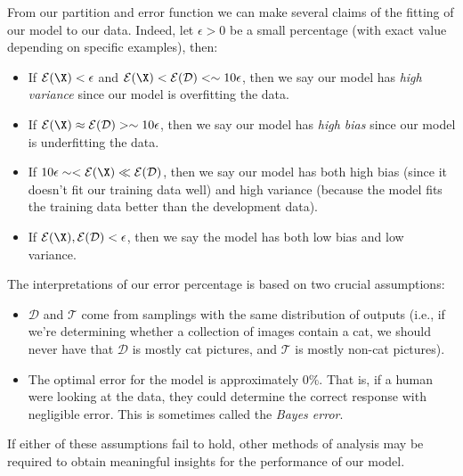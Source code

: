 From our partition and error function we can make several claims of the fitting of our model to our data.  Indeed, let $\epsilon>0$ be a small percentage (with exact value depending on specific examples), then:
\begin{itemize}
	\item If $\mathcal{E}(\X)<\epsilon$ and $\mathcal{E}(\X)<\mathcal{E}(\mathcal{D})<\sim10\epsilon$, then we say our model has \textit{high variance} since our model is overfitting the data.
	\item If $\mathcal{E}(\X)\approx\mathcal{E}(\mathcal{D})>\sim10\epsilon$, then we say our model has \textit{high bias} since our model is underfitting the data.
	\item If $10\epsilon\sim<\mathcal{E}(\X)\ll\mathcal{E}(\mathcal{D})$, then we say our model has both high bias (since it doesn't fit our training data well) and high variance (because the model fits the training data better than the development data).
	\item If $\mathcal{E}(\X),\mathcal{E}(\mathcal{D})<\epsilon$, then we say the model has both low bias and low variance.
\end{itemize}

\begin{remark}
	The interpretations of our error percentage is based on two crucial assumptions:
	\begin{itemize}
		\item $\mathcal{D}$ and $\mathcal{T}$ come from samplings with the same distribution of outputs (i.e., if we're determining whether a collection of images contain a cat, we should never have that $\mathcal{D}$ is mostly cat pictures, and $\mathcal{T}$ is mostly non-cat pictures).
		\item The optimal error for the model is approximately $0\%$.  That is, if a human were looking at the data, they could determine the correct response with negligible error.  This is sometimes called the \textit{Bayes error}.
	\end{itemize}
	If either of these assumptions fail to hold, other methods of analysis may be required to obtain meaningful insights for the performance of our model.
\end{remark}

